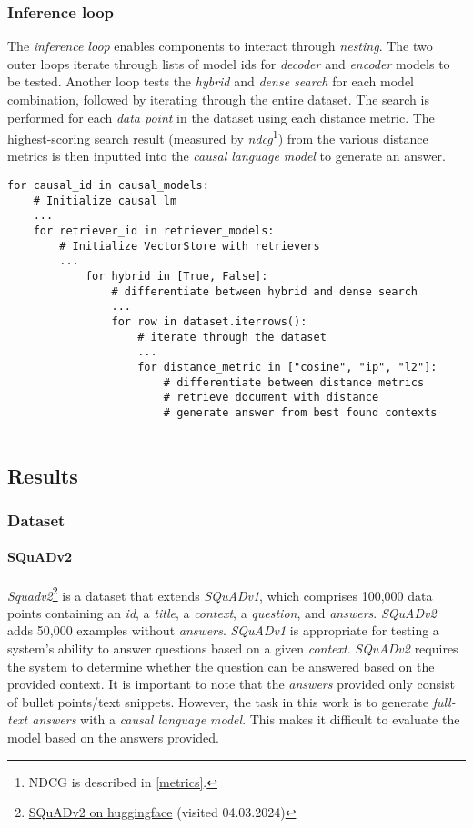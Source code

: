 \documentclass{article}
\begin{document}
\subsubsection{Inference loop}
The \textit{inference loop} enables components to interact through \textit{nesting}. The two outer loops iterate through lists of model ids for \textit{decoder} and \textit{encoder} models to be tested.
Another loop tests the \textit{hybrid} and \textit{dense search} for each model combination, followed by iterating through the entire dataset. The search is performed for each \textit{data point} in the dataset using each distance metric. The highest-scoring search result (measured by \textit{ndcg}\footnote{NDCG is described in \cref{metrics}.}) from the various distance metrics is then inputted into the \textit{causal language model} to generate an answer.
\begin{lstlisting}[backgroundcolor = \color{lightgray!25}]
for causal_id in causal_models:
    # Initialize causal lm
    ...
    for retriever_id in retriever_models:
        # Initialize VectorStore with retrievers
        ...
            for hybrid in [True, False]:
                # differentiate between hybrid and dense search
                ...
                for row in dataset.iterrows():
                    # iterate through the dataset
                    ...
                    for distance_metric in ["cosine", "ip", "l2"]:
                        # differentiate between distance metrics
                        # retrieve document with distance
                        # generate answer from best found contexts
                    
\end{lstlisting}
\subsection{Results}
\subsubsection{Dataset}
\paragraph{SQuADv2}
\textit{Squadv2}\footnote{\href{https://huggingface.co/datasets/squad_v2}{SQuADv2 on huggingface} (visited 04.03.2024)} is a dataset that extends \textit{SQuADv1}, which comprises 100,000 data points containing an \textit{id}, a \textit{title}, a \textit{context}, a \textit{question}, and \textit{answers}.   \textit{SQuADv2} adds 50,000 examples without \textit{answers}.
\textit{SQuADv1} is appropriate for testing a system's ability to answer questions based on a given \textit{context}. \textit{SQuADv2} requires the system to determine whether the question can be answered based on the provided context.
It is important to note that the \textit{answers} provided only consist of bullet points/text snippets. However, the task in this work is to generate \textit{full-text answers} with a \textit{causal language model}. This makes it difficult to evaluate the model based on the answers provided.
\end{document}
